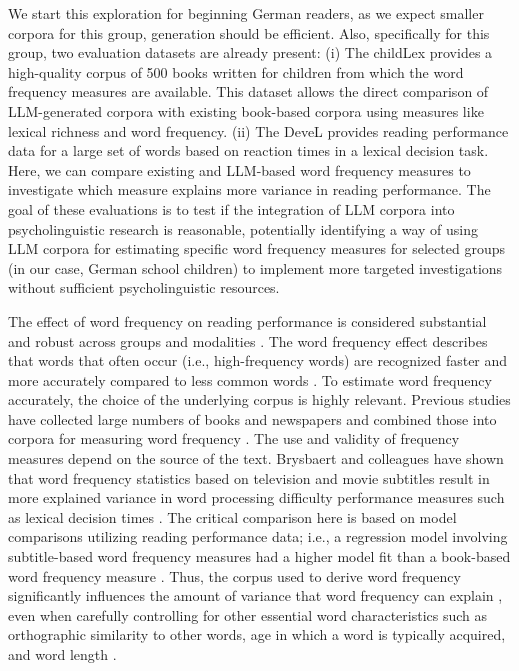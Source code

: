 \documentclass[doc, a4paper]{apa7}
\begin{document}
We start this exploration for beginning German readers, as we expect smaller corpora for this group, generation should be efficient. Also, specifically for this group, two evaluation datasets are already present: (i) The childLex provides a high-quality corpus of 500 books written for children \citep{schroeder_childlex_2015} from which the word frequency measures are available. This dataset allows the direct comparison of LLM-generated corpora with existing book-based corpora using measures like lexical richness and word frequency. (ii) The DeveL \citep{schroter_developmental_2017} provides reading performance data for a large set of words based on reaction times in a lexical decision task. Here, we can compare existing and LLM-based word frequency measures to investigate which measure explains more variance in reading performance. The goal of these evaluations is to test if the integration of LLM corpora into psycholinguistic research is reasonable, potentially identifying a way of using LLM corpora for estimating specific word frequency measures for selected groups (in our case, German school children) to implement more targeted investigations without sufficient psycholinguistic resources.

The effect of word frequency on reading performance is considered substantial and robust \citep{brysbaert_impact_2016, brysbaert_word_2018} across groups \citep[e.g.,][]{hawelka_dual-route_2010} and modalities \citep[e.g.,][]{gregorova_access_2023}. The word frequency effect describes that words that often occur (i.e., high-frequency words) are recognized faster and more accurately compared to less common words \citep[i.e., low-frequency words; ][]{adelman_contextual_2006, baayen_demythologizing_2010, brysbaert_impact_2016, gregorova_access_2023, hallin_effects_2018, lieven_input_2010, mcdonald_rethinking_2001, stokes_neighborhood_2010}. To estimate word frequency accurately, the choice of the underlying corpus is highly relevant. Previous studies have collected large numbers of books and newspapers and combined those into corpora for measuring word frequency \citep[e.g.,][]{baayen_celex_1993, heister_dlexdb_2011}. The use and validity of frequency measures depend on the source of the text. Brysbaert and colleagues \citep{brysbaert_word_2011, brysbaert_word_2018} have shown that word frequency statistics based on television and movie subtitles result in more explained variance in word processing difficulty performance measures such as lexical decision times \citep[see also][]{chilson_films_2024}. The critical comparison here is based on model comparisons utilizing reading performance data; i.e., a regression model involving subtitle-based word frequency measures had a higher model fit than a book-based word frequency measure \citep[see, e.g.,][]{brysbaert_word_2011}. Thus, the corpus used to derive word frequency significantly influences the amount of variance that word frequency can explain \citep{ferrand_french_2010, keuleers_subtlex-nl_2010, van_heuven_subtlex-uk_2014}, even when carefully controlling for other essential word characteristics such as orthographic similarity to other words, age in which a word is typically acquired, and word length \citep{graf_faktorenanalyse_2005}. 
\end{document}
